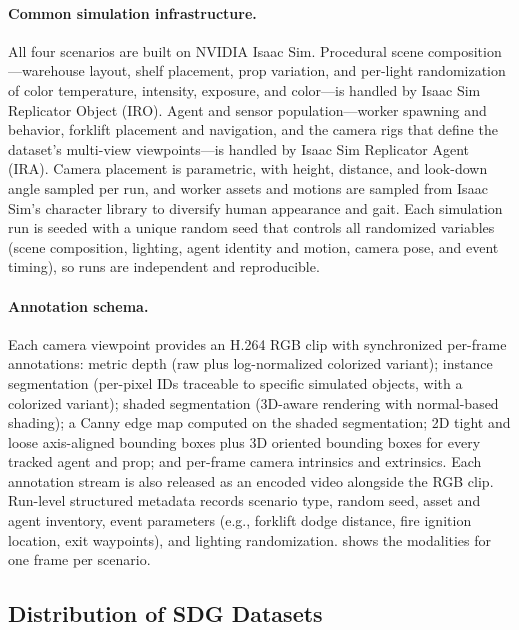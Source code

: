 \paragraph{Common simulation infrastructure.}
All four scenarios are built on NVIDIA Isaac Sim. Procedural scene composition---warehouse layout, shelf placement, prop variation, and per-light randomization of color temperature, intensity, exposure, and color---is handled by Isaac Sim Replicator Object (IRO). Agent and sensor population---worker spawning and behavior, forklift placement and navigation, and the camera rigs that define the dataset's multi-view viewpoints---is handled by Isaac Sim Replicator Agent (IRA). Camera placement is parametric, with height, distance, and look-down angle sampled per run, and worker assets and motions are sampled from Isaac Sim's character library to diversify human appearance and gait. Each simulation run is seeded with a unique random seed that controls all randomized variables (scene composition, lighting, agent identity and motion, camera pose, and event timing), so runs are independent and reproducible.

\paragraph{Annotation schema.}
Each camera viewpoint provides an H.264 RGB clip with synchronized per-frame annotations: metric depth (raw plus log-normalized colorized variant); instance segmentation (per-pixel IDs traceable to specific simulated objects, with a colorized variant); shaded segmentation (3D-aware rendering with normal-based shading); a Canny edge map computed on the shaded segmentation; 2D tight and loose axis-aligned bounding boxes plus 3D oriented bounding boxes for every tracked agent and prop; and per-frame camera intrinsics and extrinsics. Each annotation stream is also released as an encoded video alongside the RGB clip. Run-level structured metadata records scenario type, random seed, asset and agent inventory, event parameters (e.g., forklift dodge distance, fire ignition location, exit waypoints), and lighting randomization.  shows the modalities for one frame per scenario.




\subsection{Distribution of SDG Datasets}
\label{appendix:sdg_distribution}

